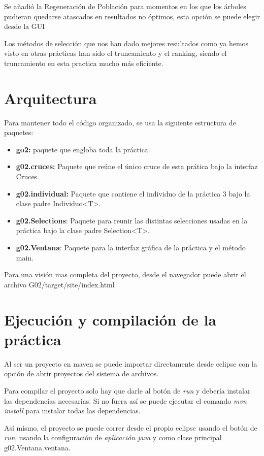 \documentclass[twoside]{AiTeX}
\begin{document}
Se añadió la Regeneración de Población para momentos en los que los árboles pudieran quedarse atascados en resultados no óptimos, esta opción se puede elegir desde la GUI

Los métodos de selección que nos han dado mejores resultados como ya hemos visto en otras prácticas han sido el truncamiento y el ranking, siendo el truncamiento en esta practica mucho más eficiente.

\section{Arquitectura}

Para mantener todo el código organizado, se usa la siguiente estructura de paquetes:

\begin{itemize}
    \item\textbf{go2:} paquete que engloba toda la práctica.
    \item\textbf{g02.cruces:} Paquete que reúne el único cruce de esta prática bajo la interfaz Cruces.
    \item\textbf{g02.individual:} Paquete que contiene el individuo de la práctica 3 bajo la clase padre Individuo<T>.
    \item\textbf{g02.Selections}: Paquete para reunir las distintas selecciones usadas en la práctica bajo la clase padre Selection<T>.
    \item\textbf{g02.Ventana}: Paquete para la interfaz gráfica de la práctica y el método main.
\end{itemize}

Para una visión mas completa del proyecto, desde el navegador puede abrir el archivo G02/target/site/index.html

\section{Ejecución y compilación de la práctica}

Al ser un proyecto en maven se puede importar directamente desde eclipse con la opción de abrir proyectos del sistema de archivos.

Para compilar el proyecto solo hay que darle al botón de \textit{run} y debería instalar las dependencias necesarias. Si no fuera así se puede ejecutar el comando \textit{mvn install} para instalar todas las dependencias.

Así mismo, el proyecto se puede correr desde el propio eclipse usando el botón de \textit{run}, usando la configuración de \textit{aplicación java} y como clase principal g02.Ventana.ventana.
\end{document}
